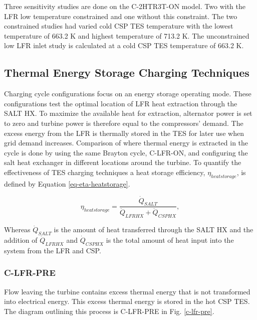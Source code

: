 \begin{paracol}{2}
\linenumbers
\switchcolumn

Three sensitivity studies are done on the C-2HTR3T-ON model. Two with the LFR low temperature constrained and one without this constraint. The two constrained studies had varied cold CSP TES temperature with the lowest temperature of 663.2 K and highest temperature of 713.2 K. The unconstrained low LFR inlet study is calculated at a cold CSP TES temperature of 663.2 K.  



\subsection{Thermal Energy Storage Charging Techniques} %

Charging cycle configurations focus on an energy storage operating mode. These configurations test the optimal location of LFR heat extraction through the SALT HX. To maximize the available heat for extraction, alternator power is set to zero and turbine power is therefore equal to the compressors' demand. The excess energy from the LFR is thermally stored in the TES for later use when grid demand increases. Comparison of where thermal energy is extracted in the cycle is done by using the same Brayton cycle, C-LFR-ON, and configuring the salt heat exchanger in different locations around the turbine. To quantify the effectiveness of TES charging techniques a heat storage efficiency, $\eta_{heatstorage}$, is defined by Equation \ref{eq-eta-heatstorage}.

\begin{equation}
    \label{eq-eta-heatstorage}
    \eta_{heatstorage} = \frac{\dot{Q}_{SALT}}{\dot{Q}_{LFRHX}+\dot{Q}_{CSPHX}},
\end{equation}

Whereas $\dot{Q}_{SALT}$ is the amount of heat transferred through the SALT HX and the addition of $\dot{Q}_{LFRHX}$ and $\dot{Q}_{CSPHX}$ is the total amount of heat input into the system from the LFR and CSP.

\subsubsection{C-LFR-PRE} %

Flow leaving the turbine contains excess thermal energy that is not transformed into electrical energy. This excess thermal energy is stored in the hot CSP TES. The diagram outlining this process is C-LFR-PRE in Fig. \ref{c-lfr-pre}.  

\end{paracol}
